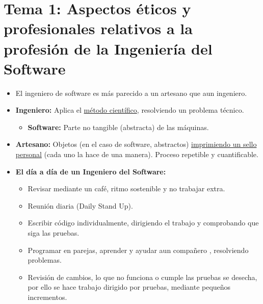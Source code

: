 \documentclass[12pt, twoside, openright]{report} %
\begin{document}






\chapter{Tema 1: Aspectos éticos y profesionales relativos a la profesión de la Ingeniería del Software}

\begin{itemize}
\item El ingeniero de software es más parecido a un artesano que aun
  ingeniero.
\item \textbf{Ingeniero:} Aplica el \underline{método científico},
  resolviendo un problema técnico.
  

  \begin{itemize}
  \item \textbf{Software:} Parte no tangible (abstracta) de las máquinas.
    
  \end{itemize}
\item \textbf{Artesano:} Objetos (en el caso de software, abstractos)
  \underline{imprimiendo un sello personal} (cada uno la hace de una
  manera). Proceso repetible y cuantificable.
  
\item \textbf{El día a día de un Ingeniero del Software:}
  

  \begin{itemize}
  \item Revisar mediante un café, ritmo sostenible y no trabajar extra.
    
  \item Reunión diaria (Daily Stand Up).
    
  \item Escribir código individualmente, dirigiendo el trabajo y comprobando
    que siga las pruebas.
    
  \item Programar en parejas, aprender y ayudar aun compañero , resolviendo
    problemas.
    
  \item Revisión de cambios, lo que no funciona o cumple las pruebas se
    desecha, por ello se hace trabajo dirigido por pruebas, mediante
    pequeños incrementos.
    

\end{itemize}
\end{itemize}
\end{document}
